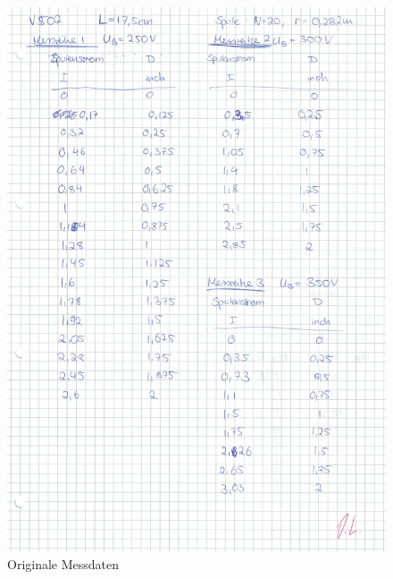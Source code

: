 \begin{figure}
  \centering
  \includegraphics[width=\textwidth]{OMD1.pdf}
  \caption{Originale Messdaten}
  \label{OMD1}
\end{figure}
